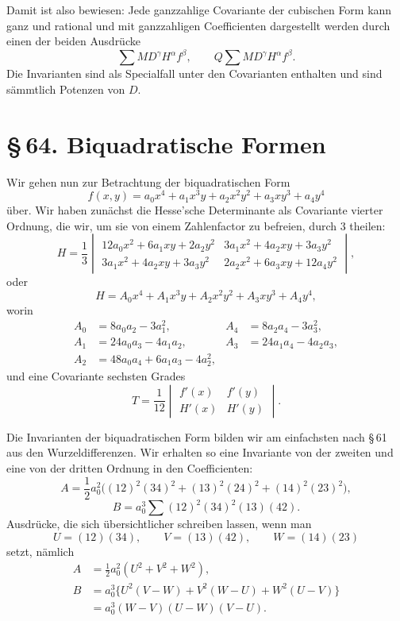 \documentclass[11pt]{article}
\providecommand{\sect}[2]{\section*{\S\,#1. #2}}
\begin{document}
Damit ist also bewiesen: Jede ganzzahlige Covariante der cubischen Form kann ganz und rational und mit ganzzahligen Coefficienten dargestellt werden durch einen der beiden Ausdrücke
\[
 \sum M D^\gamma H^\alpha f^\beta,
 \qquad
 Q\sum M D^\gamma H^\alpha f^\beta.
\]
Die Invarianten sind als Specialfall unter den Covarianten enthalten und sind sämmtlich Potenzen von $D$.

\sect{64}{Biquadratische Formen}

Wir gehen nun zur Betrachtung der biquadratischen Form
\begin{equation}
 f(x,y)=a_0x^4+a_1x^3y+a_2x^2y^2+a_3xy^3+a_4y^4
\tag{1}
\end{equation}
über. Wir haben zunächst die Hesse'sche Determinante als Covariante vierter Ordnung, die wir, um sie von einem Zahlenfactor zu befreien, durch $3$ theilen:
\begin{equation}
 H=\frac13\begin{vmatrix}
 12a_0x^2+6a_1xy+2a_2y^2 & 3a_1x^2+4a_2xy+3a_3y^2\\
 3a_1x^2+4a_2xy+3a_3y^2 & 2a_2x^2+6a_3xy+12a_4y^2
 \end{vmatrix},
\tag{2}
\end{equation}
oder
\[
 H=A_0x^4+A_1x^3y+A_2x^2y^2+A_3xy^3+A_4y^4,
\]
worin
\[
\begin{aligned}
 A_0&=8a_0a_2-3a_1^2, & A_4&=8a_2a_4-3a_3^2,\\
 A_1&=24a_0a_3-4a_1a_2, & A_3&=24a_1a_4-4a_2a_3,\\
 A_2&=48a_0a_4+6a_1a_3-4a_2^2,
\end{aligned}
\]
und eine Covariante sechsten Grades
\begin{equation}
 T=\frac1{12}\begin{vmatrix} f'(x)&f'(y)\\ H'(x)&H'(y)\end{vmatrix}.
\tag{3}
\end{equation}

Die Invarianten der biquadratischen Form bilden wir am einfachsten nach \S\,61 aus den Wurzeldifferenzen. Wir erhalten so eine Invariante von der zweiten und eine von der dritten Ordnung in den Coefficienten:
\begin{equation}
 A=\frac12a_0^2\bigl((12)^2(34)^2+(13)^2(24)^2+(14)^2(23)^2\bigr),
\tag{4}
\end{equation}
\begin{equation}
 B=a_0^3\sum(12)^2(34)^2(13)(42).
\tag{5}
\end{equation}
Ausdrücke, die sich übersichtlicher schreiben lassen, wenn man
\begin{equation}
 U=(12)(34),
 \qquad V=(13)(42),
 \qquad W=(14)(23)
\tag{6}
\end{equation}
setzt, nämlich
\begin{equation}
\begin{aligned}
 A&=\frac12a_0^2(U^2+V^2+W^2),\\
 B&=a_0^3\{U^2(V-W)+V^2(W-U)+W^2(U-V)\}\\
  &=a_0^3(W-V)(U-W)(V-U).
\end{aligned}
\tag{7}
\end{equation}
\end{document}
